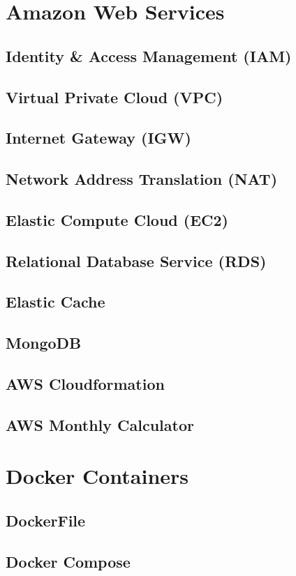 
\section{Amazon Web Services}
\subsection{Identity \& Access Management (IAM)}
\subsection{Virtual Private Cloud (VPC)}
\subsection{Internet Gateway (IGW)}
\subsection{Network Address Translation (NAT)}
\subsection{Elastic Compute Cloud (EC2)}
\subsection{Relational Database Service (RDS)}
\subsection{Elastic Cache}
\subsection{MongoDB}
\subsection{AWS Cloudformation}
\subsection{AWS Monthly Calculator}

\pagebreak
\section{Docker Containers}
\subsection{DockerFile}
\subsection{Docker Compose}